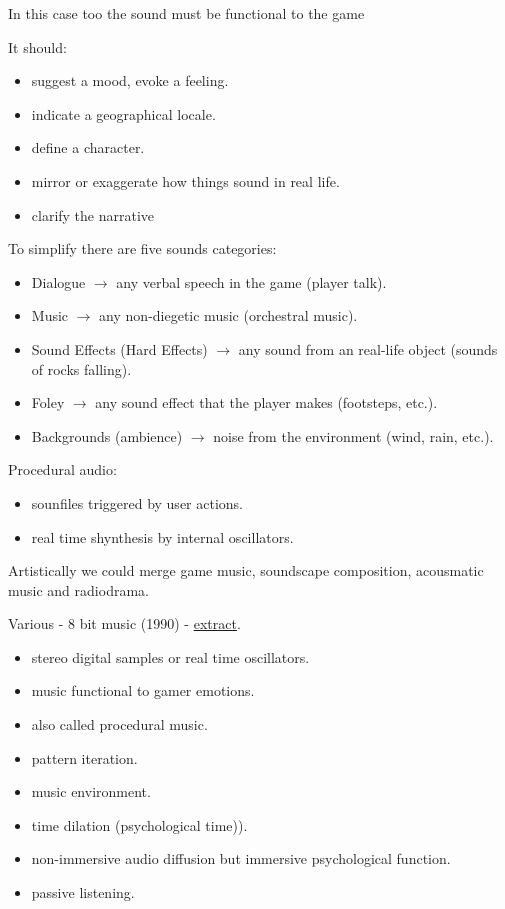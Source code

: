 In this case too the sound must be functional to the game

It should:

\begin{itemize}
\tightlist
\item suggest a mood, evoke a feeling.
\item indicate a geographical locale.
\item define a character.
\item mirror or exaggerate how things sound in real life.
\item clarify the narrative
\end{itemize}

To simplify there are five sounds categories:

\begin{itemize}
\tightlist
\item Dialogue \(\rightarrow\) any verbal speech in the game (player talk).
\item Music \(\rightarrow\) any non-diegetic music (orchestral music).
\item Sound Effects (Hard Effects) \(\rightarrow\) any sound from an real-life object (sounds of rocks falling).
\item Foley \(\rightarrow\) any sound effect that the player makes (footsteps, etc.).
\item Backgrounds (ambience) \(\rightarrow\) noise from the environment (wind, rain, etc.).
\end{itemize}

Procedural audio:

\begin{itemize}
\tightlist
\item sounfiles triggered by user actions.
\item real time shynthesis by internal oscillators.
\end{itemize}

Artistically we could merge game music, soundscape composition, acousmatic music and radiodrama.

Various - 8 bit music (1990) - \href{https://github.com/musicaecodice/EMC/blob/main/2_instruments/suoni/gaming.mp3}{extract}.

\begin{itemize}
\tightlist
\item stereo digital samples or real time oscillators.
\item music functional to gamer emotions.
\item also called procedural music.
\item pattern iteration.
\item music environment.
\item time dilation (psychological time)).
\item non-immersive audio diffusion but immersive psychological function.
\item passive listening.
\end{itemize}

